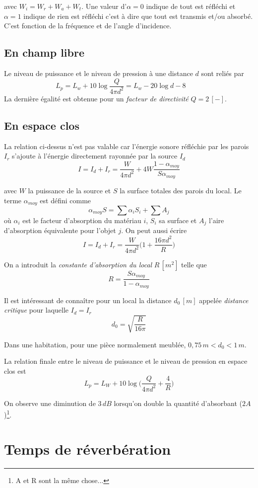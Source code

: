\documentclass[11pt]{report}
\begin{document}
avec $W_i = W_r + W_a + W_t$. Une valeur d'$\alpha=0$ indique de tout est réfléchi et $\alpha=1$ indique de rien est réfléchi c'est à dire que tout est transmis et/ou absorbé. C'est fonction de la fréquence et de l'angle d'incidence.
\\

\subsection{En champ libre} Le niveau de puissance et le niveau de pression à une distance $d$ sont reliés par
$$L_p = L_w + 10 \log \frac{Q}{4\pi d^2} = L_w - 20 \log d - 8 \hspace{1cm} $$
La dernière égalité est obtenue pour un \textit{facteur de directivité} $Q=2\,[-]$. 
\subsection{En espace clos} La relation ci-dessus n'est pas valable car l'énergie sonore réfléchie par les parois $I_r$ s'ajoute à l'énergie directement rayonnée par la source $I_d$
$$I = I_d + I_r = \frac{W}{4 \pi d^2} + 4W \frac{1-\alpha_{moy}}{S \alpha_{moy}}$$

avec $W$ la puissance de la source et $S$ la surface totales des parois du local. Le terme $\alpha_{moy}$ est défini comme
$$\alpha_{moy} S = \sum \alpha_i S_i + \sum A_j$$
où $\alpha_i$ est le facteur d'absorption du matériau $i$, $S_i$ sa surface et $A_j$ l'aire d'absorption équivalente pour l'objet $j$. On peut aussi écrire 
$$I = I_d + I_r = \frac{W}{4\pi d^2}\Bigg( 1 + \frac{16\pi d^2}{R} \Bigg)$$

On a introduit la \textit{constante d'absorption du local} $R\,[m^2]$ telle que 
$$R = \frac{S \alpha_{moy}}{1-\alpha_{moy}}$$


Il est intéressant de connaître pour un local la distance $d_0\,[m]$ appelée \textit{distance critique} pour laquelle $I_d = I_r$
$$d_0 = \sqrt{\frac{R}{16 \pi}}$$

Dans une habitation, pour une pièce normalement meublée, $0,75\,m < d_0 < 1\,m$.

La relation finale entre le niveau de puissance et le niveau de pression en espace clos est
$$L_p = L_W+ 10 \log \Bigg( \frac{Q}{4 \pi d^2} + \frac{4}{R} \Bigg)$$

On observe une diminution de $3\,dB$ lorsqu'on double la quantité d'absorbant ($2A$)\footnote{A et R sont la même chose...}.


\section{Temps de réverbération}
\end{document}
